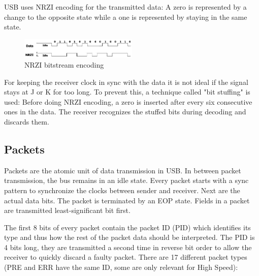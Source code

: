 \documentclass{article}
\begin{document}
USB uses NRZI encoding for the transmitted data: A zero is represented by a change to
the opposite state while a one is represented by staying in the same state.

\begin{figure}[!htbp]
  \caption{NRZI bitstream encoding}
  \centering
  \includegraphics[width=0.5\textwidth]{images/nrzi_encoding.jpg}
\end{figure}

For keeping the receiver clock in sync with the data it is not ideal if the signal
stays at J or K for too long. To prevent this, a technique called "bit stuffing"
is used: Before doing NRZI encoding, a zero is inserted after every six consecutive ones
in the data. The receiver recognizes the stuffed bits during decoding and discards them.

\subsection {Packets}

Packets are the atomic unit of data transmission in USB. In between packet transmission,
the bus remains in an idle state. Every packet starts with a sync pattern to synchronize
the clocks between sender and receiver. Next are the actual data bits. The packet is
terminated by an EOP state. Fields in a packet are transmitted least-significant
bit first.

The first 8 bits of every packet contain the packet ID (PID) which identifies its type
and thus how the rest of the packet data should be interpreted. The PID is 4 bits long, they are transmitted a second time in reverse bit order to allow the receiver to quickly
discard a faulty packet. There are 17 different packet types (PRE and ERR have the same ID,
some are only relevant for High Speed):
\end{document}
